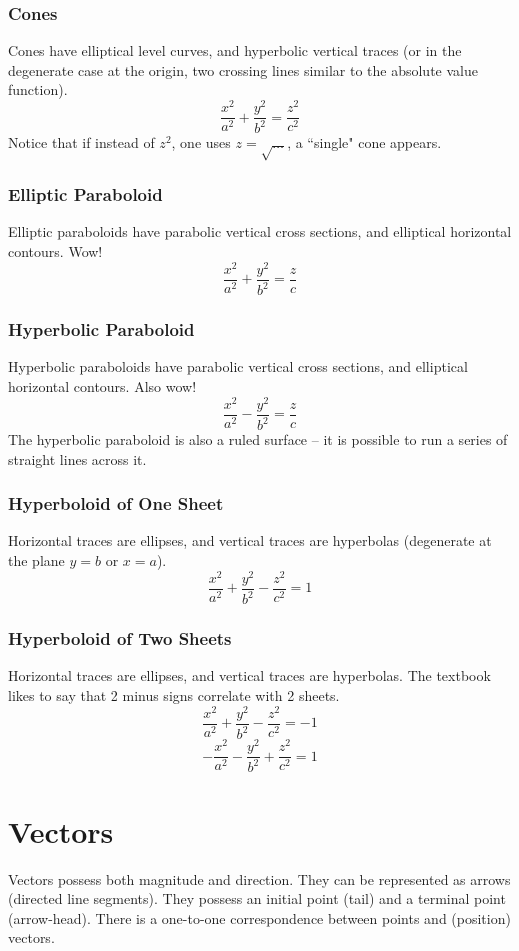 \documentclass{article}
\begin{document}
\subsubsection{Cones}
Cones have elliptical level curves, and hyperbolic vertical traces (or in the degenerate case at the origin, two crossing lines similar to the absolute value function).
$$\frac{x^2}{a^2} + \frac{y^2}{b^2} = \frac{z^2}{c^2}$$
Notice that if instead of $z^2$, one uses $z=\sqrt{\ldots}$, a ``single" cone appears.

\subsubsection{Elliptic Paraboloid}
Elliptic paraboloids have parabolic vertical cross sections, and elliptical horizontal contours. Wow!
$$\frac{x^2}{a^2} + \frac{y^2}{b^2} = \frac{z}{c}$$

\subsubsection{Hyperbolic Paraboloid}
Hyperbolic paraboloids have parabolic vertical cross sections, and elliptical horizontal contours. Also wow!
$$\frac{x^2}{a^2} - \frac{y^2}{b^2} = \frac{z}{c}$$
The hyperbolic paraboloid is also a ruled surface -- it is possible to run a series of straight lines across it.

\subsubsection{Hyperboloid of One Sheet}
Horizontal traces are ellipses, and vertical traces are hyperbolas (degenerate at the plane $y=b$ or $x=a$).
$$\frac{x^2}{a^2} + \frac{y^2}{b^2} - \frac{z^2}{c^2}=1$$

\subsubsection{Hyperboloid of Two Sheets}
Horizontal traces are ellipses, and vertical traces are hyperbolas. The textbook likes to say that 2 minus signs correlate with 2 sheets.
$$\frac{x^2}{a^2} + \frac{y^2}{b^2} - \frac{z^2}{c^2}= -1$$
$$-\frac{x^2}{a^2} - \frac{y^2}{b^2} + \frac{z^2}{c^2}= 1$$

\section{Vectors}

Vectors possess both magnitude and direction. They can be represented as arrows (directed line segments). They possess an initial point (tail) and a terminal point (arrow-head).
There is a one-to-one correspondence between points and (position) vectors.
\end{document}
